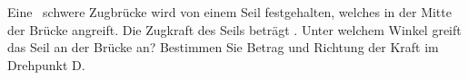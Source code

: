 Eine \mZbO\ schwere Zugbrücke wird von einem Seil festgehalten, welches in der Mitte der Brücke angreift. Die Zugkraft des Seils beträgt \FSzO. Unter welchem Winkel greift das Seil an der Brücke an? Bestimmen Sie Betrag und Richtung der Kraft im Drehpunkt D.

\begin{center}
\end{center}
